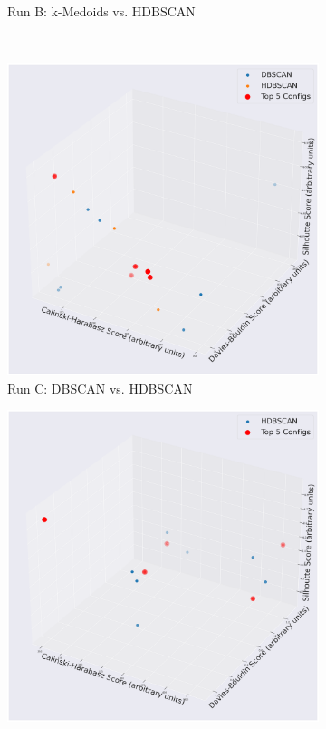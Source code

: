 \documentclass[10pt,oneside]{report}
\begin{document}
\begin{figure}[H]
\begin{subfigure}[b]{0.48\textwidth}
        \caption{Run B: k-Medoids vs. HDBSCAN}
        \label{fig:mpnet_kmedoids_vs_hdbscan_h2h_config} %
    \end{subfigure}
    \\
    \vspace{1em}
    \begin{subfigure}[b]{0.48\textwidth}
        \centering
        \includegraphics[width=\textwidth]{./images/mpnet_dbscanvshdbscan.png}
        \caption{Run C: DBSCAN vs. HDBSCAN}
        \label{fig:mpnet_dbscan_vs_hdbscan_h2h_config}
    \end{subfigure}
    \hfill
    \begin{subfigure}[b]{0.48\textwidth}
        \centering
        \includegraphics[width=\textwidth]{./images/mpnet_hdbscan.png}

\end{subfigure}
\end{figure}
\end{document}

